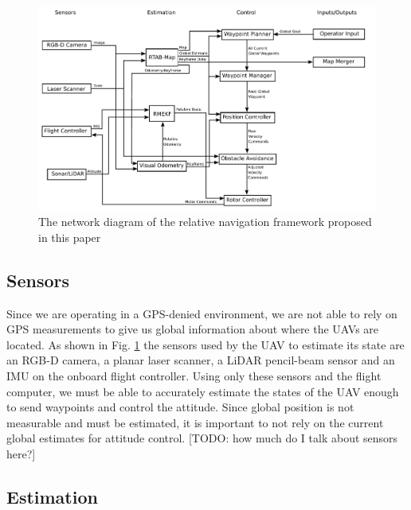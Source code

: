 \documentclass[letterpaper, 10 pt, conference]{ieeeconf}  %
\newcommand{\todo}[1]{{\color{blue}[TODO: #1]}}
\begin{document}
\begin{figure}
\centering
\includegraphics[width=1.0\linewidth]{rtab_relative_nav_network}
\caption{The network diagram of the relative navigation framework proposed in this paper}
\label{fig:rtab_network}
\end{figure}

\subsection{Sensors}

Since we are operating in a GPS-denied environment, we are not able to rely on GPS measurements to give us global information about where the UAVs are located. As shown in Fig. \ref{fig:rtab_network} the sensors used by the UAV to estimate its state are an RGB-D camera, a planar laser scanner, a LiDAR pencil-beam sensor and an IMU on the onboard flight controller. Using only these sensors and the flight computer, we must be able to accurately estimate the states of the UAV enough to send waypoints and control the attitude. Since global position is not measurable and must be estimated, it is important to not rely on the current global estimates for attitude control. \todo{how much do I talk about sensors here?}

\subsection{Estimation}
\end{document}
